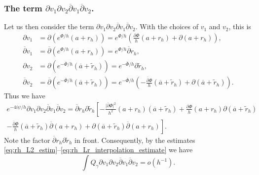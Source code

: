 \documentclass[12pt]{amsart}
\def\p{\partial}
\DeclarePairedDelimiter\norm{\lVert}{\rVert}
\theoremstyle{definition}
\theoremstyle{remark}
\newcommand{\abs}[1]{\lvert #1 \rvert}
\newcommand{\eps}{\epsilon}
\newcommand{\op}{\overline \p}
\begin{document}
\subsubsection{The term  $\p v_1 \p v_2 \overline \p v_1 \overline \p v_2$.} \label{sec:subleading_term}
Let us then consider the term $\p v_1 \p v_2 \overline \p v_1 \overline \p v_2$. With the choices of $v_1$ and $v_2$, this is
\begin{align*}
 \p v_1&=\p (e^{\Phi/h}(a+r_h))=e^{\Phi/h}\left(\frac{\p \Phi}{h}(a+r_h)+\p(a+r_h)\right),  \\
 \op v_1&=\op (e^{\Phi/h}(a+r_h))=e^{\Phi/h}\op r_h, \\
 \p v_2&=\p (e^{-\overline\Phi/h}(\overline a+\tilde r_h))= e^{-\overline\Phi/h}\p \tilde r_h, \\
 \op v_2&=\op (e^{-\overline\Phi/h}(\overline a+\tilde r_h))=e^{-\overline\Phi/h}\left(-\frac{\overline\p \Phi}{h}(\overline a+\tilde r_h)+\p(\overline a+\tilde r_h)\right).
\end{align*}
Thus we have
% 
% 
\begin{multline*}
 e^{-4i\psi/h}\p v_1 \p v_2 \overline \p v_1 \overline \p v_2 =\op r_h\p \tilde r_h\left[-\frac{\abs{\overline\p \Phi}^2}{h^2}(a+ r_h)(\overline a+\tilde r_h)+\frac{\p \Phi}{h}(a+r_h)\p(\overline a+\tilde r_h)\right.\\
 \left.-\frac{\overline\p \Phi}{h}(\overline a+\tilde r_h)\op (a+r_h)+\p(\overline a+\tilde r_h)\op (a+r_h)\right]. 
\end{multline*}
Note the factor $\op r_h\p \tilde r_h$ in front. Consequently, by the estimates \eqref{eq:rh_L2_estim}--\eqref{eq:rh_Lr_interpolation_estimate} we have
\[
 \int Q_\gamma \p v_1 \p v_2 \overline \p v_1 \overline \p v_2=o(h^{-1}).
\]
% 
% 
\end{document}
